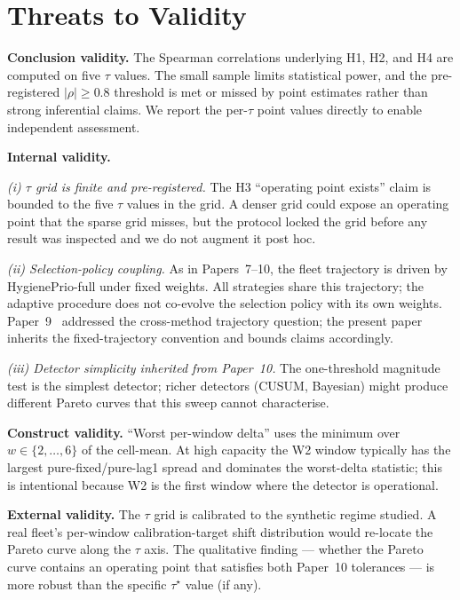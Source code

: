 \section{Threats to Validity}
\label{sec:threats}

\textbf{Conclusion validity.} The Spearman correlations underlying
H1, H2, and H4 are computed on five $\tau$ values. The small sample
limits statistical power, and the pre-registered $|\rho| \geq 0.8$
threshold is met or missed by point estimates rather than strong
inferential claims. We report the per-$\tau$ point values directly
to enable independent assessment.

\textbf{Internal validity.}

\textit{(i) $\tau$ grid is finite and pre-registered.} The H3
``operating point exists'' claim is bounded to the five $\tau$ values
in the grid. A denser grid could expose an operating point that the
sparse grid misses, but the protocol locked the grid before any
result was inspected and we do not augment it post hoc.

\textit{(ii) Selection-policy coupling.} As in Papers~7--10, the
fleet trajectory is driven by HygienePrio-full under \textsf{fixed}
weights. All strategies share this trajectory; the adaptive
procedure does not co-evolve the selection policy with its own
weights. Paper~9~\cite{paper9selftraj} addressed the cross-method
trajectory question; the present paper inherits the fixed-trajectory
convention and bounds claims accordingly.

\textit{(iii) Detector simplicity inherited from Paper~10.} The
one-threshold magnitude test is the simplest detector; richer
detectors (CUSUM, Bayesian) might produce different Pareto curves
that this sweep cannot characterise.

\textbf{Construct validity.} ``Worst per-window delta'' uses the
minimum over $w \in \{2, \ldots, 6\}$ of the cell-mean. At high
capacity the W2 window typically has the largest pure-fixed/pure-lag1
spread and dominates the worst-delta statistic; this is intentional
because W2 is the first window where the detector is operational.

\textbf{External validity.} The $\tau$ grid is calibrated to the
synthetic regime studied. A real fleet's per-window calibration-target
shift distribution would re-locate the Pareto curve along the
$\tau$ axis. The qualitative finding --- whether the Pareto curve
contains an operating point that satisfies both Paper~10 tolerances ---
is more robust than the specific $\tau^\star$ value (if any).
